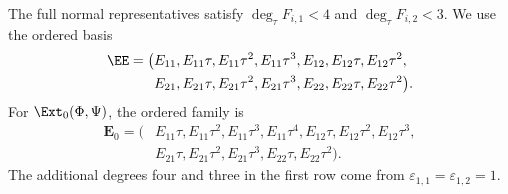 The full normal representatives satisfy
$\deg_\tau F_{i,1}<4$ and $\deg_\tau F_{i,2}<3$.
We use the ordered basis
\[
\begin{aligned}
 \EE=\big(&E_{11},E_{11}\tau,E_{11}\tau^2,E_{11}\tau^3,
            E_{12},E_{12}\tau,E_{12}\tau^2,\\
          &E_{21},E_{21}\tau,E_{21}\tau^2,E_{21}\tau^3,
            E_{22},E_{22}\tau,E_{22}\tau^2\big).
\end{aligned}
\]
For $\Ext_0(\Phi,\Psi)$, the ordered family is
\[
\begin{aligned}
 \mathbf E_0=\big(&E_{11}\tau,E_{11}\tau^2,E_{11}\tau^3,
                   E_{11}\tau^4,
                   E_{12}\tau,E_{12}\tau^2,E_{12}\tau^3,\\
                 &E_{21}\tau,E_{21}\tau^2,E_{21}\tau^3,
                   E_{22}\tau,E_{22}\tau^2\big).
\end{aligned}
\]
The additional degrees four and three in the first row
come from $\varepsilon_{1,1}=\varepsilon_{1,2}=1$.

